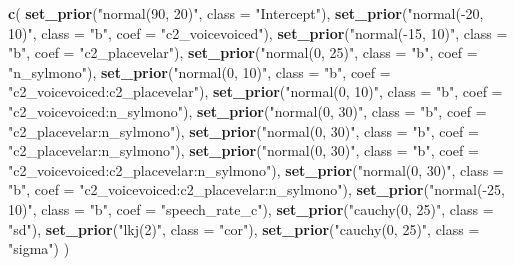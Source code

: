 \documentclass[11pt,]{article}
\newenvironment{Shaded}{\begin{snugshade}}{\end{snugshade}}
\newcommand{\DataTypeTok}[1]{\textcolor[rgb]{0.13,0.29,0.53}{#1}}
\newcommand{\KeywordTok}[1]{\textcolor[rgb]{0.13,0.29,0.53}{\textbf{#1}}}
\newcommand{\NormalTok}[1]{#1}
\newcommand{\StringTok}[1]{\textcolor[rgb]{0.31,0.60,0.02}{#1}}
\begin{document}
\begin{Shaded}
\begin{Highlighting}[]
\KeywordTok{c}\NormalTok{(}
  \KeywordTok{set_prior}\NormalTok{(}\StringTok{"normal(90, 20)"}\NormalTok{, }\DataTypeTok{class =} \StringTok{"Intercept"}\NormalTok{),}
  \KeywordTok{set_prior}\NormalTok{(}\StringTok{"normal(-20, 10)"}\NormalTok{, }\DataTypeTok{class =} \StringTok{"b"}\NormalTok{, }\DataTypeTok{coef =} \StringTok{"c2_voicevoiced"}\NormalTok{),}
  \KeywordTok{set_prior}\NormalTok{(}\StringTok{"normal(-15, 10)"}\NormalTok{, }\DataTypeTok{class =} \StringTok{"b"}\NormalTok{, }\DataTypeTok{coef =} \StringTok{"c2_placevelar"}\NormalTok{),}
  \KeywordTok{set_prior}\NormalTok{(}\StringTok{"normal(0, 25)"}\NormalTok{, }\DataTypeTok{class =} \StringTok{"b"}\NormalTok{, }\DataTypeTok{coef =} \StringTok{"n_sylmono"}\NormalTok{),}
  \KeywordTok{set_prior}\NormalTok{(}\StringTok{"normal(0, 10)"}\NormalTok{, }\DataTypeTok{class =} \StringTok{"b"}\NormalTok{, }\DataTypeTok{coef =} \StringTok{"c2_voicevoiced:c2_placevelar"}\NormalTok{),}
  \KeywordTok{set_prior}\NormalTok{(}\StringTok{"normal(0, 10)"}\NormalTok{, }\DataTypeTok{class =} \StringTok{"b"}\NormalTok{, }\DataTypeTok{coef =} \StringTok{"c2_voicevoiced:n_sylmono"}\NormalTok{),}
  \KeywordTok{set_prior}\NormalTok{(}\StringTok{"normal(0, 30)"}\NormalTok{, }\DataTypeTok{class =} \StringTok{"b"}\NormalTok{, }\DataTypeTok{coef =} \StringTok{"c2_placevelar:n_sylmono"}\NormalTok{),}
  \KeywordTok{set_prior}\NormalTok{(}\StringTok{"normal(0, 30)"}\NormalTok{, }\DataTypeTok{class =} \StringTok{"b"}\NormalTok{, }\DataTypeTok{coef =} \StringTok{"c2_placevelar:n_sylmono"}\NormalTok{),}
  \KeywordTok{set_prior}\NormalTok{(}\StringTok{"normal(0, 30)"}\NormalTok{, }\DataTypeTok{class =} \StringTok{"b"}\NormalTok{, }\DataTypeTok{coef =} \StringTok{"c2_voicevoiced:c2_placevelar:n_sylmono"}\NormalTok{),}
  \KeywordTok{set_prior}\NormalTok{(}\StringTok{"normal(0, 30)"}\NormalTok{, }\DataTypeTok{class =} \StringTok{"b"}\NormalTok{, }\DataTypeTok{coef =} \StringTok{"c2_voicevoiced:c2_placevelar:n_sylmono"}\NormalTok{),}
  \KeywordTok{set_prior}\NormalTok{(}\StringTok{"normal(-25, 10)"}\NormalTok{, }\DataTypeTok{class =} \StringTok{"b"}\NormalTok{, }\DataTypeTok{coef =} \StringTok{"speech_rate_c"}\NormalTok{),}
  \KeywordTok{set_prior}\NormalTok{(}\StringTok{"cauchy(0, 25)"}\NormalTok{, }\DataTypeTok{class =} \StringTok{"sd"}\NormalTok{),}
  \KeywordTok{set_prior}\NormalTok{(}\StringTok{"lkj(2)"}\NormalTok{, }\DataTypeTok{class =} \StringTok{"cor"}\NormalTok{),}
  \KeywordTok{set_prior}\NormalTok{(}\StringTok{"cauchy(0, 25)"}\NormalTok{, }\DataTypeTok{class =} \StringTok{"sigma"}\NormalTok{)}
\NormalTok{)}
\end{Highlighting}
\end{Shaded}
\end{document}
